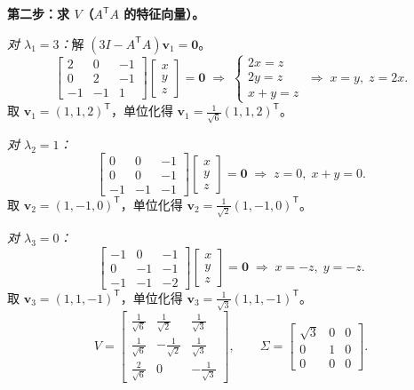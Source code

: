 \documentclass{article}
\begin{document}
\textbf{第二步：求 $V$（$A^{\mathsf T}A$ 的特征向量）。}

\textit{对 $\lambda_1=3$：}解 $(3I-A^{\mathsf T}A)\bm{v}_1=\bm{0}$。
\[
\begin{bmatrix}
2 & 0 & -1\\
0 & 2 & -1\\
-1 & -1 & 1
\end{bmatrix}\begin{bmatrix}x\\y\\z\end{bmatrix}=\bm{0}
\;\Rightarrow\;
\begin{cases}2x=z\\2y=z\\x+y=z\end{cases}
\;\Rightarrow\; x=y,\;z=2x.
\]
取 $\bm{v}_1=(1,1,2)^{\mathsf T}$，单位化得 $\bm{v}_1=\frac{1}{\sqrt{6}}(1,1,2)^{\mathsf T}$。

\textit{对 $\lambda_2=1$：}
\[
\begin{bmatrix}
0 & 0 & -1\\
0 & 0 & -1\\
-1 & -1 & -1
\end{bmatrix}\begin{bmatrix}x\\y\\z\end{bmatrix}=\bm{0}
\;\Rightarrow\; z=0,\;x+y=0.
\]
取 $\bm{v}_2=(1,-1,0)^{\mathsf T}$，单位化得 $\bm{v}_2=\frac{1}{\sqrt{2}}(1,-1,0)^{\mathsf T}$。

\textit{对 $\lambda_3=0$：}
\[
\begin{bmatrix}
-1 & 0 & -1\\
0 & -1 & -1\\
-1 & -1 & -2
\end{bmatrix}\begin{bmatrix}x\\y\\z\end{bmatrix}=\bm{0}
\;\Rightarrow\; x=-z,\;y=-z.
\]
取 $\bm{v}_3=(1,1,-1)^{\mathsf T}$，单位化得 $\bm{v}_3=\frac{1}{\sqrt{3}}(1,1,-1)^{\mathsf T}$。
\[
V = \begin{bmatrix}
\frac{1}{\sqrt{6}} & \frac{1}{\sqrt{2}} & \frac{1}{\sqrt{3}}\\[4pt]
\frac{1}{\sqrt{6}} & -\frac{1}{\sqrt{2}} & \frac{1}{\sqrt{3}}\\[4pt]
\frac{2}{\sqrt{6}} & 0 & -\frac{1}{\sqrt{3}}
\end{bmatrix},\qquad
\Sigma = \begin{bmatrix}
\sqrt{3} & 0 & 0\\
0 & 1 & 0\\
0 & 0 & 0
\end{bmatrix}.
\]
\end{document}
